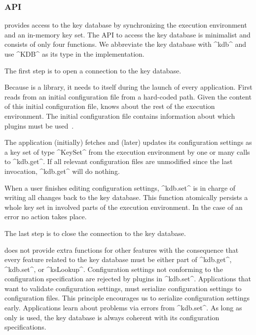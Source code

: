 \subsubsection{API}
\label{sec:kdb-api}

 provides access to the key database by synchronizing the execution environment and an in-memory key set.
The API to access the key database is minimalist and consists of only four functions.
We abbreviate the key database with ^kdb^ and use ^KDB^ as its type in the implementation.

\begin{description}[font=\textintro]
\item[kdb.open():] 
The first step is to open a connection to the key database.

\label{sec:bootstrapping}
Because  is a library, it needs to  itself during the launch of every application.
First  reads from an initial configuration file from a hard-coded path.
Given the content of this initial configuration file,  knows about the rest of the execution environment.
The initial configuration file contains information about which plugins must be used~\cite{raab2015kps}.
\item[kdb.get(\texttt{KeySet}):] 
The application (initially) fetches and (later) updates its configuration settings as a key set of type ^KeySet^ from the execution environment by one or many calls to ^kdb.get^.
If all relevant configuration files are unmodified since the last invocation, ^kdb.get^ will do nothing.
\item[kdb.set(\texttt{KeySet}):] 
When a user finishes editing configuration settings, ^kdb.set^ is in charge of writing all changes back to the key database.
This function atomically persists a whole key set in involved parts of the execution environment.
In the case of an error no action takes place.
\item[kdb.close():] 
The last step is to close the connection to the key database.
\end{description}

\elektra{} does not provide extra functions for other features with the consequence that every feature related to the key database must be either part of ^kdb.get^, ^kdb.set^, or ^ksLookup^.
Configuration settings not conforming to the configuration specification are rejected by plugins in ^kdb.set^.
Applications that want to validate configuration settings, must serialize configuration settings to configuration files.
This principle encourages us to serialize configuration settings early.
Applications learn about problems via errors from ^kdb.set^.
As long as only \elektra{} is used, the key database is always coherent with its configuration specifications.

